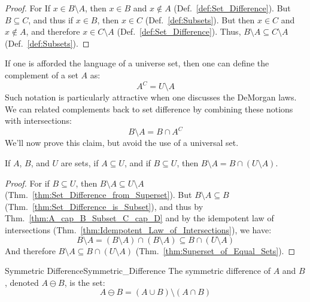         \begin{proof}
            For If $x\in{B}\setminus{A}$, then $x\in{B}$ and $x\notin{A}$
            (Def.~\ref{def:Set_Difference}). But $B\subseteq{C}$, and thus
            if $x\in{B}$, then $x\in{C}$ (Def.~\ref{def:Subsets}). But then
            $x\in{C}$ and $x\notin{A}$, and therefore $x\in{C}\setminus{A}$
            (Def.~\ref{def:Set_Difference}). Thus,
            $B\setminus{A}\subseteq{C}\setminus{A}$ (Def.~\ref{def:Subsets}).
        \end{proof} 
        If one is afforded the language of a universe set, then one can define
        the complement of a set $A$ as:
        \begin{equation}
            A^{C}=U\setminus{A}
        \end{equation}
        Such notation is particularly attractive when one discusses the
        DeMorgan laws. We can related complements back to set difference by
        combining these notions with intersections:
        \begin{equation}
            B\setminus{A}=B\cap{A}^{C}
        \end{equation}
        We'll now prove this claim, but avoid the use of a universal set.
        \begin{theorem}
            If $A$, $B$, and $U$ are sets, if $A\subseteq{U}$, and if
            $B\subseteq{U}$, then $B\setminus{A}=B\cap(U\setminus{A})$.
        \end{theorem}
        \begin{proof}
            For if $B\subseteq{U}$, then $B\setminus{A}\subseteq{U}\setminus{A}$
            (Thm.~\ref{thm:Set_Difference_from_Superset}). But
            $B\setminus{A}\subseteq{B}$
            (Thm.~\ref{thm:Set_Difference_is_Subset}), and thus by
            Thm.~\ref{thm:A_cap_B_Subset_C_cap_D} and by the idempotent law of
            intersections (Thm.~\ref{thm:Idempotent_Law_of_Intersections}),
            we have:
            \begin{equation}
                B\setminus{A}=(B\setminus{A})\cap(B\setminus{A})
                    \subseteq{B}\cap(U\setminus{A})
            \end{equation}
            And therefore $B\setminus{A}\subseteq{B}\cap(U\setminus{A})$
            (Thm.~\ref{thm:Superset_of_Equal_Sets}).
        \end{proof}
        \begin{fdefinition}{Symmetric Difference}{Symmetric_Difference}
            The symmetric difference of $A$ and $B$, denoted $A\ominus{B}$, is
            the set:
            \begin{equation*}
                A\ominus{B}
                =(A\cup{B})\setminus(A\cap{B})
            \end{equation*}
        \end{fdefinition}
